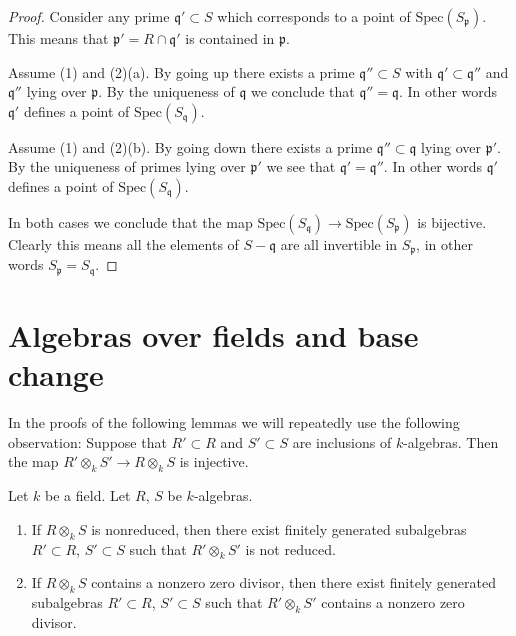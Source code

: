 \begin{proof}
Consider any prime $\mathfrak q' \subset S$ which corresponds to
a point of $\text{Spec}(S_{\mathfrak p})$. This means that
$\mathfrak p' = R \cap \mathfrak q'$ is contained in $\mathfrak p$.

\medskip\noindent
Assume (1) and (2)(a).
By going up there exists a prime $\mathfrak q'' \subset S$
with $\mathfrak q' \subset \mathfrak q''$ and $\mathfrak q''$
lying over $\mathfrak p$. By the uniqueness of $\mathfrak q$ we
conclude that $\mathfrak q'' = \mathfrak q$. In other words
$\mathfrak q'$ defines a point of $\text{Spec}(S_{\mathfrak q})$.

\medskip\noindent
Assume (1) and (2)(b).
By going down there exists a prime $\mathfrak q'' \subset \mathfrak q$
lying over $\mathfrak p'$. By the uniqueness of primes lying over
$\mathfrak p'$ we see that $\mathfrak q' = \mathfrak q''$.  In other words
$\mathfrak q'$ defines a point of $\text{Spec}(S_{\mathfrak q})$.

\medskip\noindent
In both cases we conclude that the map
$\text{Spec}(S_{\mathfrak q}) \to \text{Spec}(S_{\mathfrak p})$
is bijective. Clearly this means all the elements of $S - \mathfrak q$
are all invertible in $S_{\mathfrak p}$, in other words
$S_{\mathfrak p} = S_{\mathfrak q}$.
\end{proof}














\section{Algebras over fields and base change}
\label{section-algebras-over-fields}

\noindent
In the proofs of the following lemmas we will repeatedly use
the following observation: Suppose that $R' \subset R$ and
$S' \subset S$ are inclusions of $k$-algebras.
Then the map $R' \otimes_k S' \to R \otimes_k S$
is injective.

\begin{lemma}
\label{lemma-limit-argument}
Let $k$ be a field. Let $R$, $S$ be $k$-algebras.
\begin{enumerate}
\item If $R \otimes_k S$ is nonreduced, then there exist
finitely generated subalgebras $R' \subset R$,
$S' \subset S$ such that $R' \otimes_k S'$ is not reduced.
\item If $R \otimes_k S$ contains a nonzero zero divisor, then there exist
finitely generated subalgebras $R' \subset R$,
$S' \subset S$ such that $R' \otimes_k S'$ contains a nonzero zero divisor.
\end{enumerate}
\end{lemma}

